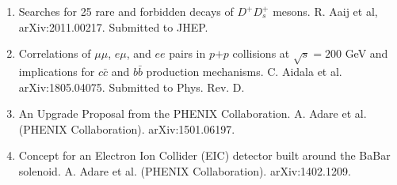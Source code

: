 \documentclass[11pt]{article}
\begin{document}
\begin{flushleft}
\begin{center}
\begin{enumerate}
		\item Searches for 25 rare and forbidden decays of $D^+D_s^+ $ mesons. R. Aaij et al, arXiv:2011.00217. Submitted to JHEP.

	
			
		\item Correlations of $\mu\mu$, $e\mu$, and $ee$ pairs in $p$$+$$p$ collisions at $\sqrt{s}=200$ GeV and implications for $c\bar{c}$ and $b\bar{b}$ production mechanisms. C. Aidala et al. arXiv:1805.04075. Submitted to Phys. Rev. D.
		\item An Upgrade Proposal from the PHENIX Collaboration. A. Adare et al. (PHENIX Collaboration). arXiv:1501.06197.
		\item Concept for an Electron Ion Collider (EIC) detector built around the BaBar solenoid. A. Adare et al. (PHENIX Collaboration). arXiv:1402.1209.
		
\end{enumerate}
	
\end{center}


\end{flushleft}









\end{document}
